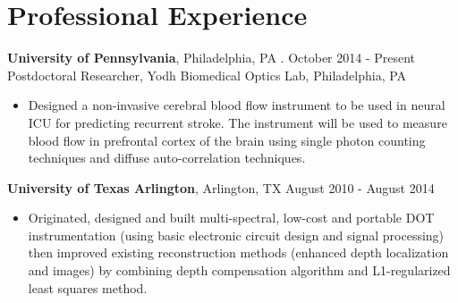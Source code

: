 \documentclass{my_cv}
\begin{document}

\section{Professional Experience}
\vspace{2pt} 
\begin{flushleft}  

\textbf{University of Pennsylvania}, Philadelphia, PA . \hfill October 2014 - Present \\ 
Postdoctoral Researcher, Yodh Biomedical Optics Lab, Philadelphia, PA
\vspace{-2mm}
\begin{itemize} \itemsep -2pt %
\item Designed a non-invasive cerebral blood flow instrument to be used in neural ICU for predicting recurrent stroke. The instrument will be used to measure blood flow in prefrontal cortex of the brain using single photon counting techniques and diffuse auto-correlation techniques. 
\end{itemize}
 \vspace{-2mm}
\textbf{University of Texas Arlington}, Arlington, TX \hfill August 2010 - August 2014 \\ 
\begin{itemize} \itemsep -2pt %
\vspace{-2.5mm}
\item Originated, designed and built multi-spectral, low-cost and portable DOT instrumentation (using basic electronic circuit design and signal processing) then improved existing reconstruction methods (enhanced depth localization and images) by combining depth compensation algorithm and L1-regularized least squares method.

\end{itemize}
\end{flushleft}
 

\vspace{-7mm} %

\end{document}
